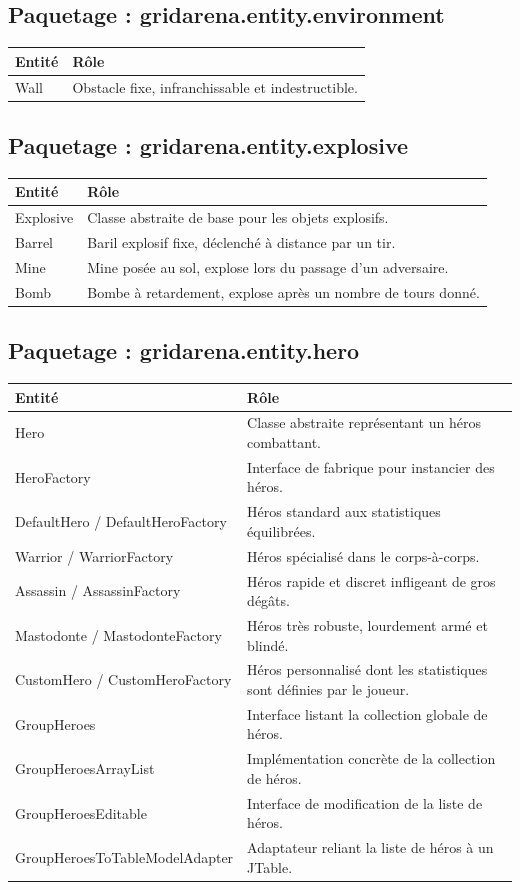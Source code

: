 \documentclass[12pt, a4paper]{article}
\begin{document}
\subsection{Paquetage : gridarena.entity.environment}
\begin{tabular}{|p{7cm}|p{8cm}|}
\hline
\textbf{Entité} & \textbf{Rôle} \\ \hline
Wall & Obstacle fixe, infranchissable et indestructible. \\ \hline
\end{tabular}

\subsection{Paquetage : gridarena.entity.explosive}
\begin{tabular}{|p{7cm}|p{8cm}|}
\hline
\textbf{Entité} & \textbf{Rôle} \\ \hline
Explosive & Classe abstraite de base pour les objets explosifs. \\ \hline
Barrel & Baril explosif fixe, déclenché à distance par un tir. \\ \hline
Mine & Mine posée au sol, explose lors du passage d'un adversaire. \\ \hline
Bomb & Bombe à retardement, explose après un nombre de tours donné. \\ \hline
\end{tabular}

\subsection{Paquetage : gridarena.entity.hero}
\begin{tabular}{|p{7cm}|p{8cm}|}
\hline
\textbf{Entité} & \textbf{Rôle} \\ \hline
Hero & Classe abstraite représentant un héros combattant. \\ \hline
HeroFactory & Interface de fabrique pour instancier des héros. \\ \hline
DefaultHero / DefaultHeroFactory & Héros standard aux statistiques équilibrées. \\ \hline
Warrior / WarriorFactory & Héros spécialisé dans le corps-à-corps. \\ \hline
Assassin / AssassinFactory & Héros rapide et discret infligeant de gros dégâts. \\ \hline
Mastodonte / MastodonteFactory & Héros très robuste, lourdement armé et blindé. \\ \hline
CustomHero / CustomHeroFactory & Héros personnalisé dont les statistiques sont définies par le joueur. \\ \hline
GroupHeroes & Interface listant la collection globale de héros. \\ \hline
GroupHeroesArrayList & Implémentation concrète de la collection de héros. \\ \hline
GroupHeroesEditable & Interface de modification de la liste de héros. \\ \hline
GroupHeroesToTableModelAdapter & Adaptateur reliant la liste de héros à un JTable. \\ \hline
\end{tabular}
\end{document}
